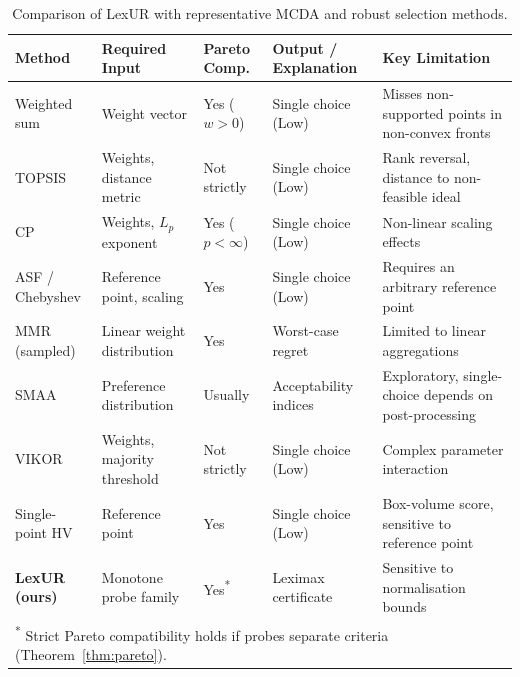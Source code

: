 \begin{table}[t]
\centering\small
\caption{Comparison of LexUR with representative MCDA and robust selection methods.}
\label{tab:positioning}
\begin{tabular}{p{2.2cm}p{3.2cm}p{1.3cm}p{2.6cm}p{3.7cm}}
\toprule
Method & Required Input & Pareto Comp. & Output / Explanation & Key Limitation \\
\midrule
Weighted sum & Weight vector & Yes ($w>0$) & Single choice (Low) & Misses non-supported points in non-convex fronts \\
TOPSIS & Weights, distance metric & Not strictly & Single choice (Low) & Rank reversal, distance to non-feasible ideal \\
CP & Weights, $L_p$ exponent & Yes ($p<\infty$) & Single choice (Low) & Non-linear scaling effects \\
ASF / Chebyshev & Reference point, scaling & Yes & Single choice (Low) & Requires an arbitrary reference point \\
MMR (sampled) & Linear weight distribution & Yes & Worst-case regret & Limited to linear aggregations \\
SMAA & Preference distribution & Usually & Acceptability indices & Exploratory, single-choice depends on post-processing \\
VIKOR & Weights, majority threshold & Not strictly & Single choice (Low) & Complex parameter interaction \\
Single-point HV & Reference point & Yes & Single choice (Low) & Box-volume score, sensitive to reference point \\
\textbf{LexUR (ours)} & Monotone probe family & Yes\textsuperscript{*} & Leximax certificate & Sensitive to normalisation bounds \\
\bottomrule
\multicolumn{5}{l}{\footnotesize \textsuperscript{*} Strict Pareto compatibility holds if probes separate criteria (Theorem~\ref{thm:pareto}).}
\end{tabular}
\end{table}
